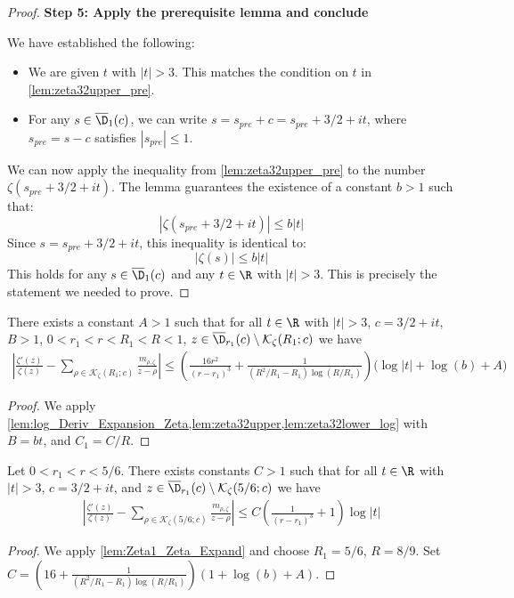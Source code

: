 \begin{proof}
\textbf{Step 5: Apply the prerequisite lemma and conclude}

We have established the following:
\begin{itemize}
    \item We are given $t$ with $|t|>3$. This matches the condition on $t$ in \cref{lem:zeta32upper_pre}.
    \item For any $s \in \overline{\D}_1(c)$, we can write $s = s_{pre} + c = s_{pre} + 3/2 + it$, where $s_{pre} = s-c$ satisfies $|s_{pre}| \le 1$.
\end{itemize}
We can now apply the inequality from \cref{lem:zeta32upper_pre} to the number $\zeta(s_{pre} + 3/2 + it)$. The lemma guarantees the existence of a constant $b>1$ such that:
$$ |\zeta(s_{pre} + 3/2 + it)| \le b|t| $$
Since $s = s_{pre} + 3/2 + it$, this inequality is identical to:
$$ |\zeta(s)| \le b|t| $$
This holds for any $s \in \overline{\D}_1(c)$ and any $t \in \R$ with $|t|>3$. This is precisely the statement we needed to prove.
\end{proof}

\begin{lemma}\label{lem:Zeta1_Zeta_Expand} 
\leanok
There exists a constant $A>1$ such that for all $t\in\R$ with $|t|>3$, $c=3/2+it$, $B>1$, $0<r_1<r<R_1<R<1$, $z\in\overline{\D}_{r_1}(c)\setminus \mathcal K_\zeta(R_1;c)$ we have
\begin{align*}
\left|\frac{\zeta'(z)}{\zeta(z)} - \sum_{\rho\in\mathcal K_{\zeta}(R_1;c)} \frac{m_{\rho,\zeta}}{z-\rho} \right| \le \left(\frac{16 r^2}{(r-r_1)^3} + \frac{1}{(R^2/R_1 - R_1)\log(R/R_1)}\right)\Big(\log|t| + \log(b) + A\Big)
\end{align*}
\end{lemma}
\begin{proof}
\leanok
We apply \cref{lem:log_Deriv_Expansion_Zeta,lem:zeta32upper,lem:zeta32lower_log} with $B=bt$, and $C_1=C/R$.
\end{proof}

\begin{lemma}\label{lem:Zeta1_Zeta_Expansion}
\leanok
Let $0< r_1 < r < 5/6$.
There exists constants $C>1$ such that for all $t\in\R$ with $|t|>3$, $c=3/2+it$, and $z\in\overline{\D}_{r_1}(c)\setminus \mathcal K_\zeta(5/6;c)$ we have
\begin{align*}
\left|\frac{\zeta'(z)}{\zeta(z)} - \sum_{\rho\in\mathcal K_{\zeta}(5/6;c)} \frac{m_{\rho,\zeta}}{z-\rho} \right| \le C\left(\frac{1}{(r-r_1)^3} + 1\right)\log|t|
\end{align*}
\end{lemma}
\begin{proof}
\leanok
We apply \cref{lem:Zeta1_Zeta_Expand} and choose $R_1 = 5/6$, $R=8/9$.
Set $C=\left(16 + \frac{1}{(R^2/R_1 - R_1)\log(R/R_1)}\right)(1 + \log(b) + A)$.
\end{proof}
